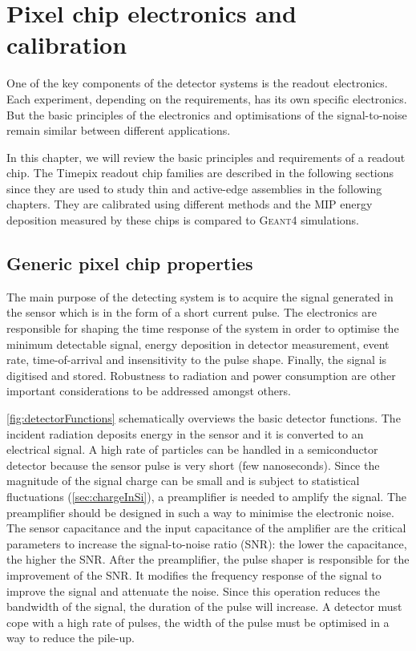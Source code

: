 \chapter{Pixel chip electronics and calibration}
\label{ch:FE_electronics}

One of the key components of the detector systems is the readout
electronics. Each experiment, depending on the requirements, has its
own specific electronics. But the basic principles of the electronics
and optimisations of the signal-to-noise remain similar between
different applications.

In this chapter, we will review the basic principles and requirements
of a readout chip. The Timepix readout chip families are described in
the following sections since they are used to study thin and
active-edge assemblies in the following chapters. They are calibrated
using different methods and the MIP energy deposition measured by
these chips is compared to \textsc{Geant4} simulations.

\section{Generic pixel chip properties}

The main purpose of the detecting system is to acquire the signal
generated in the sensor which is in the form of a short current
pulse. The electronics are responsible for shaping the time response
of the system in order to optimise the minimum detectable signal,
energy deposition in detector measurement, event rate, time-of-arrival
and insensitivity to the pulse shape. Finally, the signal is digitised
and stored. Robustness to radiation and power consumption are other
important considerations to be addressed amongst others.

\cref{fig:detectorFunctions} schematically overviews the basic
detector functions. The incident radiation deposits energy in the
sensor and it is converted to an electrical signal. A high rate of
particles can be handled in a semiconductor detector because the
sensor pulse is very short (few nanoseconds). Since the magnitude of
the signal charge can be small and is subject to statistical
fluctuations (\cref{sec:chargeInSi}), a preamplifier is needed to
amplify the signal. The preamplifier should be designed in such a way
to minimise the electronic noise. The sensor capacitance and the input
capacitance of the amplifier are the critical parameters to increase
the signal-to-noise ratio (SNR): the lower the capacitance, the higher
the SNR. After the preamplifier, the pulse shaper is responsible for the
improvement of the SNR. It modifies the frequency response of the
signal to improve the signal and attenuate the noise. Since this
operation reduces the bandwidth of the signal, the duration of the
pulse will increase. A detector must cope with a high rate of pulses,
the width of the pulse must be optimised in a way to reduce the
pile-up.

